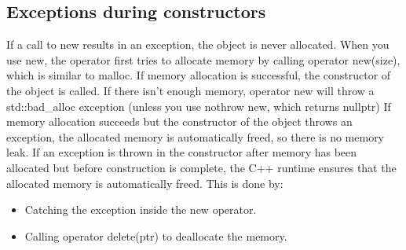 \documentclass{report}
\begin{document}
    \subsection{Exceptions during constructors}
    \bigbreak \noindent 
    If a call to new results in an exception, the object is never allocated.
    When you use new, the operator first tries to allocate memory by calling operator new(size), which is similar to malloc.
    \bigbreak \noindent 
    If memory allocation is successful, the constructor of the object is called.
    \bigbreak \noindent 
    If there isn't enough memory, operator new will throw a std::bad\_alloc exception (unless you use nothrow new, which returns nullptr)
    \bigbreak \noindent 
    If memory allocation succeeds but the constructor of the object throws an exception, the allocated memory is automatically freed, so there is no memory leak. If an exception is thrown in the constructor after memory has been allocated but before construction is complete, the C++ runtime ensures that the allocated memory is automatically freed. This is done by:
    \begin{itemize}
        \item Catching the exception inside the new operator.
        \item Calling operator delete(ptr) to deallocate the memory.
    \end{itemize}
\end{document}
